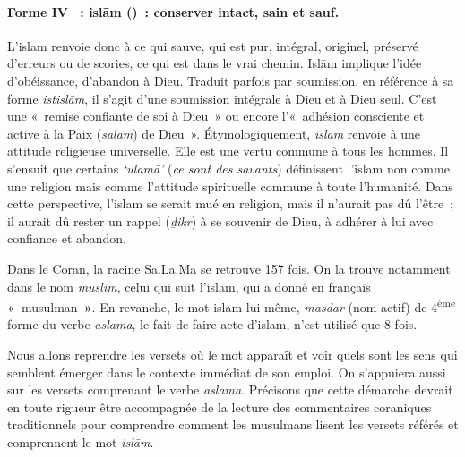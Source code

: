 \paragraph{ Forme IV~ : islām ()~:
conserver intact, sain et sauf.
}

L'islam renvoie donc à ce qui sauve, qui est pur, intégral, originel,
préservé d'erreurs ou de scories, ce qui est dans le vrai chemin. Islām
implique l'idée d'obéissance, d'abandon à Dieu. Traduit parfois par
soumission, en référence à sa forme \emph{istislām}, il s'agit d'une
soumission intégrale à Dieu et à Dieu seul. C'est une «~remise confiante
de soi à Dieu~» ou
encore l'«~adhésion consciente et active à la Paix (\emph{salām}) de
Dieu~». Étymologiquement, \emph{islām} renvoie à une attitude religieuse
universelle. Elle est une vertu commune à tous les hommes. Il s'ensuit
que certains \emph{`ulamā'} (\emph{ce sont des savants}) définissent
l'islam non comme une religion mais comme l'attitude spirituelle commune
à toute l'humanité. Dans cette perspective, l'islam se serait mué en
religion, mais il n'aurait pas dû l'être~; il aurait dû rester un rappel
(\emph{ḏikr}) à se souvenir de Dieu, à adhérer à lui avec confiance et
abandon.


Dans le Coran, la racine Sa.La.Ma se retrouve 157 fois. On la trouve
notamment dans le nom \emph{muslim}, celui qui suit l'islam, qui a donné
en français \textbf{«}~musulman~\textbf{»}. En revanche, le mot islam
 lui-même, \emph{masdar} (nom actif) de
4\textsuperscript{ème} forme du verbe \emph{aslama}, le fait de faire
acte d'islam, n'est utilisé que 8 fois.

Nous allons reprendre les versets où le mot apparaît et voir quels sont
les sens qui semblent émerger dans le contexte immédiat de son emploi.
On s'appuiera aussi sur les versets comprenant le verbe \emph{aslama}.
Précisons que cette démarche devrait en toute rigueur être accompagnée
de la lecture des commentaires coraniques traditionnels pour comprendre
comment les musulmans lisent les versets référés et comprennent le mot
\emph{islām}.


